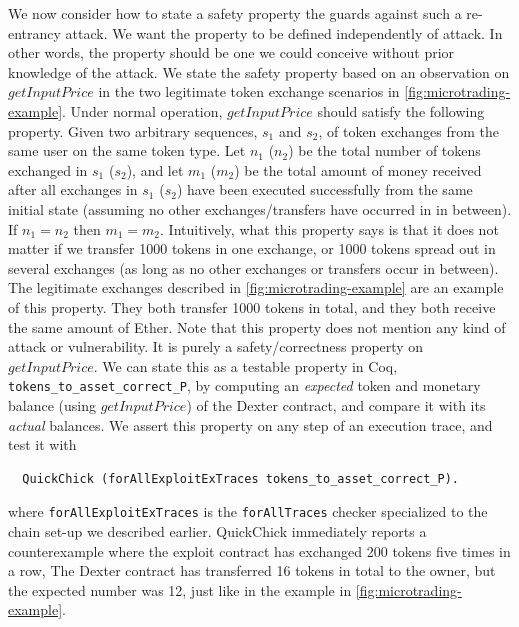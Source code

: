 \documentclass[twoside,11pt,openright]{report}
\newenvironment{code}{\captionsetup{type=figure, singlelinecheck=off, justification=raggedleft}}{}
\newcommand{\coq}[1]{\texttt{#1}}
\begin{document}
We now consider how to state a safety property the guards against such a re-entrancy attack. We want the property to be defined independently of attack. In other words, the property should be one we could conceive without prior knowledge of the attack. We state the safety property based on an observation on $getInputPrice$ in the two legitimate token exchange scenarios in \autoref{fig:microtrading-example}. Under normal operation, $getInputPrice$ should satisfy the following property. Given two arbitrary sequences, $s_1$ and $s_2$, of token exchanges from the same user on the same token type. Let $n_1$ ($n_2$) be the total number of tokens exchanged in $s_1$ ($s_2$), and let $m_1$ ($m_2$) be the total amount of money received after all exchanges in $s_1$ ($s_2$) have been executed successfully from the same initial state (assuming no other exchanges/transfers have occurred in in between). If $n_1 = n_2$ then $m_1 = m_2$. Intuitively, what this property says is that it does not matter if we transfer 1000 tokens in one exchange, or 1000 tokens spread out in several exchanges (as long as no other exchanges or transfers occur in between). The legitimate exchanges described in \autoref{fig:microtrading-example} are an example of this property. They both transfer 1000 tokens in total, and they both receive the same amount of Ether. Note that this property does not mention any kind of attack or vulnerability. It is purely a safety/correctness property on $getInputPrice$. We can state this as a testable property in Coq, \coq{tokens\_to\_asset\_correct\_P}, by computing an \textit{expected} token and monetary balance (using $getInputPrice$) of the Dexter contract, and compare it with its \textit{actual} balances. We assert this property on any step of an execution trace, and test it with
\begin{code}
\begin{verbatim}
  QuickChick (forAllExploitExTraces tokens_to_asset_correct_P).
\end{verbatim}
\end{code}
where \coq{forAllExploitExTraces} is the \coq{forAllTraces} checker specialized to the chain set-up we described earlier. QuickChick immediately reports a counterexample where the exploit contract has exchanged 200 tokens five times in a row, The Dexter contract has transferred 16 tokens in total to the owner, but the expected number was 12, just like in the example in \autoref{fig:microtrading-example}.
\end{document}
